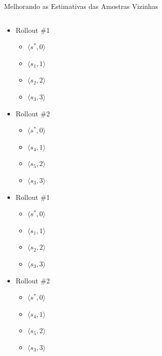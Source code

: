 \documentclass{beamer}
\begin{document}
\begin{frame}{Melhorando as Estimativas das Amostras Vizinhas}
\begin{columns}
\begin{column}{0.5\textwidth}
 {
    \begin{itemize}
        \item Rollout \#1
        \begin{itemize}
            \item $\langle s^*, 0 \rangle$
            \item $\langle s_1, 1 \rangle$
            \item $\langle s_2, 2 \rangle$
            \item $\langle s_3, 3 \rangle$
        \end{itemize}
    \end{itemize}
}
 {
    \begin{itemize}
        \item Rollout \#2
        \begin{itemize}
            \item $\langle s^*, 0 \rangle$
            \item $\langle s_4, 1 \rangle$
            \item $\langle s_5, 2 \rangle$
            \item $\langle s_3, 3 \rangle$
        \end{itemize}
    \end{itemize}
}
 {
    \begin{itemize}
        \item Rollout \#1
        \begin{itemize}
            \item $\langle s^*, 0 \rangle$
            \item $\langle s_1, 1 \rangle$
            \item $\langle s_2, 2 \rangle$
            \item $\langle s_3, 3 \rangle$
        \end{itemize}
        \item Rollout \#2
        \begin{itemize}
            \item $\langle s^*, 0 \rangle$
            \item $\langle s_4, 1 \rangle$
            \item $\langle s_5, 2 \rangle$
            \item $\langle s_3, 3 \rangle$
        \end{itemize}

\end{itemize}}
\end{column}
\end{columns}
\end{frame}
\end{document}
